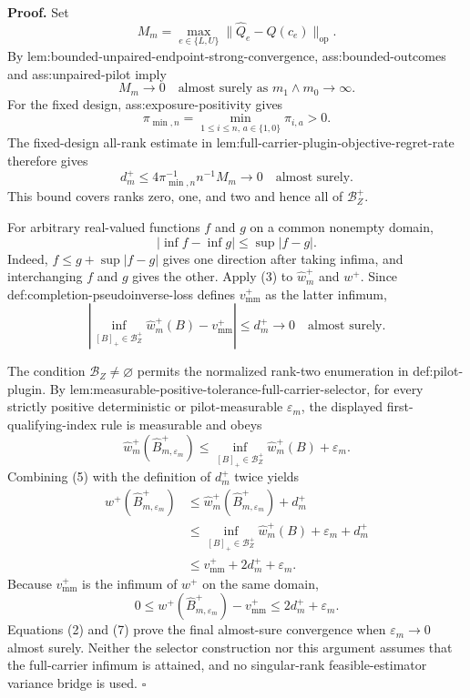 \textbf{Proof.}
Set
\[
M_m=\max_{e\in\{L,U\}}
\lVert\widehat Q_e-Q(c_e)\rVert_{\mathrm{op}}.
\]
By lem:bounded-unpaired-endpoint-strong-convergence, ass:bounded-outcomes and ass:unpaired-pilot imply
\[
M_m\longrightarrow0
\quad\text{almost surely as }m_1\wedge m_0\to\infty.
\tag{1}
\]
For the fixed design, ass:exposure-positivity gives
\[
\pi_{\min,n}=\min_{1\le i\le n,\,a\in\{1,0\}}\pi_{i,a}>0.
\]
The fixed-design all-rank estimate in lem:full-carrier-plugin-objective-regret-rate therefore gives
\[
d_m^+
\le4\pi_{\min,n}^{-1}n^{-1}M_m
\longrightarrow0
\quad\text{almost surely}.
\tag{2}
\]
This bound covers ranks zero, one, and two and hence all of \(\mathcal B_Z^+\).

For arbitrary real-valued functions \(f\) and \(g\) on a common nonempty domain,
\[
\left|\inf f-\inf g\right|\le\sup|f-g|.
\tag{3}
\]
Indeed, \(f\le g+\sup|f-g|\) gives one direction after taking infima, and interchanging \(f\) and \(g\) gives the other.  Apply (3) to \(\widehat w_m^+\) and \(w^+\).  Since def:completion-pseudoinverse-loss defines \(v_{\mathrm{mm}}^+\) as the latter infimum,
\[
\left|
\inf_{[B]_+\in\mathcal B_Z^+}\widehat w_m^+(B)
-v_{\mathrm{mm}}^+
\right|
\le d_m^+\longrightarrow0
\quad\text{almost surely}.
\tag{4}
\]

The condition \(\mathcal B_Z\ne\varnothing\) permits the normalized rank-two enumeration in def:pilot-plugin.  By lem:measurable-positive-tolerance-full-carrier-selector, for every strictly positive deterministic or pilot-measurable \(\varepsilon_m\), the displayed first-qualifying-index rule is measurable and obeys
\[
\widehat w_m^+(\widehat B_{m,\varepsilon_m}^+)
\le
\inf_{[B]_+\in\mathcal B_Z^+}\widehat w_m^+(B)+\varepsilon_m.
\tag{5}
\]
Combining (5) with the definition of \(d_m^+\) twice yields
\[
\begin{aligned}
w^+(\widehat B_{m,\varepsilon_m}^+)
&\le \widehat w_m^+(\widehat B_{m,\varepsilon_m}^+)+d_m^+\\
&\le \inf_{[B]_+\in\mathcal B_Z^+}\widehat w_m^+(B)
   +\varepsilon_m+d_m^+\\
&\le v_{\mathrm{mm}}^++2d_m^++\varepsilon_m.
\end{aligned}
\tag{6}
\]
Because \(v_{\mathrm{mm}}^+\) is the infimum of \(w^+\) on the same domain,
\[
0\le
w^+(\widehat B_{m,\varepsilon_m}^+)-v_{\mathrm{mm}}^+
\le2d_m^++\varepsilon_m.
\tag{7}
\]
Equations (2) and (7) prove the final almost-sure convergence when \(\varepsilon_m\to0\) almost surely.  Neither the selector construction nor this argument assumes that the full-carrier infimum is attained, and no singular-rank feasible-estimator variance bridge is used. \(\square\)